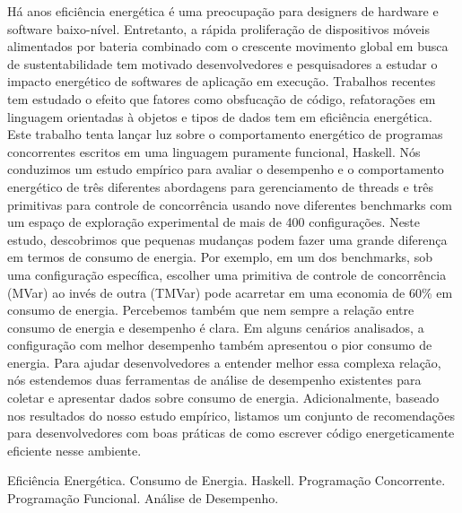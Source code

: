 \noindent
Há anos eficiência energética é uma preocupação para designers de hardware e software baixo-nível. Entretanto, a rápida proliferação de dispositivos móveis alimentados por bateria combinado com o crescente movimento global em busca de sustentabilidade tem motivado desenvolvedores e pesquisadores a estudar o impacto energético de softwares de aplicação em execução. Trabalhos recentes tem estudado o efeito que fatores como obsfucação de código, refatorações em linguagem orientadas à objetos e tipos de dados tem em eficiência energética. Este trabalho tenta lançar luz sobre o comportamento energético de programas concorrentes escritos em uma linguagem puramente funcional, Haskell. %
Nós conduzimos um estudo empírico para avaliar o desempenho e o comportamento energético de três diferentes abordagens para gerenciamento de threads e três primitivas para controle de concorrência usando nove diferentes benchmarks com um espaço de exploração experimental de mais de 400 configurações. Neste estudo, descobrimos que pequenas mudanças podem fazer uma grande diferença em termos de consumo de energia. Por exemplo, em um dos benchmarks, sob uma configuração específica, escolher uma primitiva de controle de concorrência (MVar) ao invés de outra (TMVar) pode acarretar em uma economia de 60\% em consumo de energia. Percebemos também que nem sempre a relação entre consumo de energia e desempenho é clara. Em alguns cenários analisados, a configuração com melhor desempenho também apresentou o pior consumo de energia. %
Para ajudar desenvolvedores a entender melhor essa complexa relação, nós estendemos duas ferramentas de análise de desempenho existentes para coletar e apresentar dados sobre consumo de energia. Adicionalmente, baseado nos resultados do nosso estudo empírico, listamos um conjunto de recomendações para desenvolvedores com boas práticas de como escrever código energeticamente eficiente nesse ambiente.

\begin{keywords}
Eficiência Energética. Consumo de Energia. Haskell. Programação Concorrente. Programação Funcional. Análise de Desempenho.
\end{keywords}
